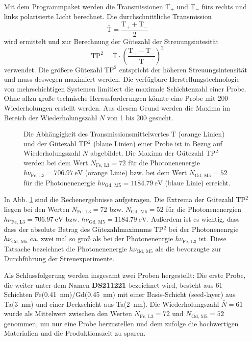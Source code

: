 \noindent
Mit dem Programmpaket werden die Transmissionen T$_+$ und T$_-$ fürs rechts und links polarisierte Licht berechnet. Die durchschnittliche Transmission
\begin{equation}
    \bar{\text{T}} = \frac{\text{T}_+ + \text{T}_-}{2}
\end{equation}
wird ermittelt und zur Berechnung der Gütezahl der Streuungsintesität
\begin{equation}
    \text{TP}^2 = \bar{\text{T}}\cdot\left(\frac{\text{T}_+ - \text{T}_-}{\bar{\text{T}}}\right)^2
\end{equation}
verwendet. Die größere Gütezahl $\text{TP}^2$ entspricht der höheren Streuungsintensität und muss deswegen maximiert werden. Die verfügbare Herstellungstechnologie von mehrschichtigen Systemen limitiert die maximale Schichtenzahl einer Probe. Ohne allzu große technische Herausforderungen könnte eine Probe mit 200 Wiederholungen erstellt werden. Aus diesem Grund werden die Maxima im Bereich der Wiederholungszahl $N$ von 1 bis 200 gesucht.
\begin{figure}[H]
    \centering
    
    \caption{Die Abhängigkeit des Transmissionsmittelwertes $\bar{\text{T}}$ (orange Linien) und der Gütezahl TP$^2$ (blaue Linien) einer Probe ist in Bezug auf Wiederholungszahl $N$ abgebildet. Die Maxima der Gütezahl TP$^2$ werden bei dem Wert $N_{\text{Fe, L3}}=72$ für die Photonenenergie $h\nu_{\text{Fe, L3}}=\SI{706,97}{\eV}$ (orange Linie) bzw. bei dem Wert $N_{\text{Gd, M5}}=52$ für die Photonenenergie $h\nu_{\text{Gd, M5}}=\SI{1184,79}{\eV}$ (blaue Linie) erreicht.}
    \label{fig:proben_vergleich_centered}
\end{figure}
\noindent
In Abb. \ref{fig:proben_vergleich_centered} sind die Rechenergebnisse aufgetragen. Die Extrema der Gütezahl TP$^2$ liegen bei den Werten $N_{\text{Fe, L3}}=72$  bzw. $N_{\text{Gd, M5}}=52$ für die Photonenenergien $h\nu_{\text{Fe, L3}}=\SI{706,97}{\eV}$ bzw. $h\nu_{\text{Gd, M5}}=\SI{1184,79}{\eV}$. Außerdem ist es wichtig, dass dass der absolute Betrag des Gütezahlmaximums TP$^2$ bei der Photonenenrgie $h\nu_{\text{Gd, M5}}$ ca. zwei mal so groß als bei der Photonenenrgie $h\nu_{\text{Fe, L3}}$ ist. Diese Tatsache bezeichnet die Photonenenergie $h\nu_{\text{Gd, M5}}$ als die bevorzugte zur Durchführung der Streuexperimente.

\noindent
Als Schlussfolgerung werden insgesamt zwei Proben hergestellt:
Die erste Probe, die weiter unter dem Namen \textbf{DS211221} bezeichnet wird, besteht aus 61 Schichten Fe(\SI{0.41}{\nano\meter})/Gd(\SI{0.45}{\nano\meter}) mit einer Basis-Schicht (seed-layer) aus Ta(\SI{3}{\nano\meter}) und einer Deckschicht aus Ta(\SI{2}{\nano\meter}). Die Wiederholungszahl $\bar{N} = 61$ wurde als Mittelwert zwischen den Werten $N_{\text{Fe, L3}}=72$ und $N_{\text{Gd, M5}}=52$ genommen, um nur eine Probe herzustellen und dem zufolge die hochwertigen Materialien und die Produktionszeit zu sparen.

